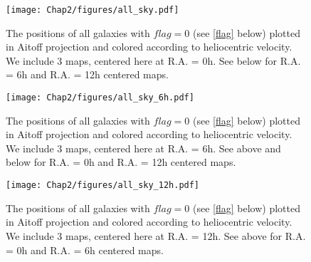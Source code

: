 \begin{figure}[htb!]
        \centering
        \vspace{0pt}
        \texttt{[image: Chap2/figures/all\_sky.pdf]} \label{a}
        \caption{\small{The positions of all galaxies with $flag=0$ (see \ref{flag} below) plotted in Aitoff projection and colored according to heliocentric velocity. We include 3 maps, centered here at R.A. = 0h. See below for R.A. = 6h and R.A. = 12h centered maps.}}
        \label{allskyvhel}
\end{figure}
\begin{figure}[htb!]\ContinuedFloat
        \centering
        \vspace{0pt}      
        \texttt{[image: Chap2/figures/all\_sky\_6h.pdf]} \label{b}
        \caption{\small{The positions of all galaxies with $flag=0$ (see \ref{flag} below) plotted in Aitoff projection and colored according to heliocentric velocity. We include 3 maps, centered here at R.A. = 6h. See above and below for R.A. = 0h and R.A. = 12h centered maps.}}
        \label{allskyvhel}
\end{figure}
\begin{figure}[htb!]\ContinuedFloat
        \centering
        \vspace{0pt}
        \texttt{[image: Chap2/figures/all\_sky\_12h.pdf]} \label{c}
        \caption{\small{The positions of all galaxies with $flag=0$ (see \ref{flag} below) plotted in Aitoff projection and colored according to heliocentric velocity. We include 3 maps, centered here at R.A. = 12h. See above for R.A. = 0h and R.A. = 6h centered maps.}}
        \label{allskyvhel}
\end{figure}



